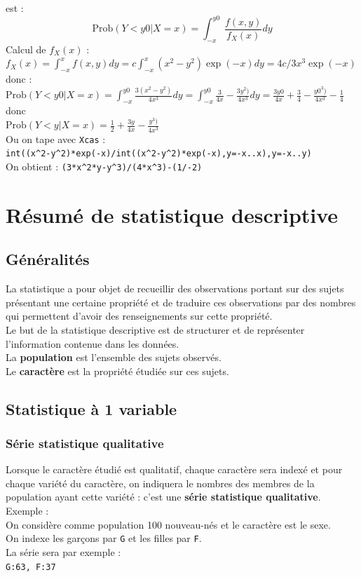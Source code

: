 \documentclass[a4paper,11pt]{book}
\begin{document}
\begin{enumerate}
\begin{enumerate}
est :\\
$$\mbox{Prob}(Y<y0|X=x)=\int_{-x}^{y0}\frac{f(x,y)}{f_X(x)}dy$$
Calcul de $f_X(x)$ :\\
$f_X(x)=\int_{-x}^xf(x,y)dy=c\int_{-x}^x(x^2-y^2)\exp(-x)dy=4c/3x^3\exp(-x)$
donc :\\
$\mbox{Prob}(Y<y0|X=x)=\int_{-x}^{y0}\frac{3(x^2-y^2)}{4x^3}dy=
\int_{-x}^{y0}\frac{3}{4x}-\frac{3y^2)}{4x^3}dy=\frac{3y0}{4x}+\frac{3}{4}-\frac{y0^3)}{4x^3}-\frac{1}{4}$\\
donc\\
$\mbox{Prob}(Y<y|X=x)=\frac{1}{2}+\frac{3y}{4x}-\frac{y^3)}{4x^3}$\\
Ou on tape avec {\tt Xcas} :\\
{\tt int((x\verb|^|2-y\verb|^|2)*exp(-x)/int((x\verb|^|2-y\verb|^|2)*exp(-x),y=-x..x),y=-x..y)}\\
On obtient : {\tt (3*x\verb|^|2*y-y\verb|^|3)/(4*x\verb|^|3)-(1/-2)}\\
\end{enumerate}
\end{enumerate}


\chapter{R\'esum\'e de statistique descriptive}
\section{G\'en\'eralit\'es}
La statistique a pour objet de recueillir des observations portant sur des
sujets pr\'esentant une certaine  
propri\'et\'e et de traduire ces observations par des nombres qui permettent 
d'avoir des renseignements sur cette propri\'et\'e. \\
Le but de la statistique descriptive est de structurer et de repr\'esenter 
l'information contenue dans les donn\'ees.\\ 
La {\bf population} est l'ensemble des sujets observ\'es.\\
Le {\bf caract\`ere} est la propri\'et\'e \'etudi\'ee sur ces sujets.
\section{Statistique \`a 1 variable}
\subsection{S\'erie statistique qualitative}
Lorsque le caract\`ere \'etudi\'e est qualitatif, chaque caract\`ere sera 
index\'e et pour chaque vari\'et\'e du caract\`ere, on indiquera le nombres des
membres de la population ayant cette vari\'et\'e : c'est une 
{\bf s\'erie statistique qualitative}.\\
Exemple :\\
On consid\`ere comme population 100 nouveau-n\'es et le caract\`ere est le 
sexe.\\
On indexe les gar\c{c}ons par {\tt G} et les filles par {\tt F}.\\
La s\'erie sera par exemple :\\
{\tt G:63, F:37} 
\end{document}
